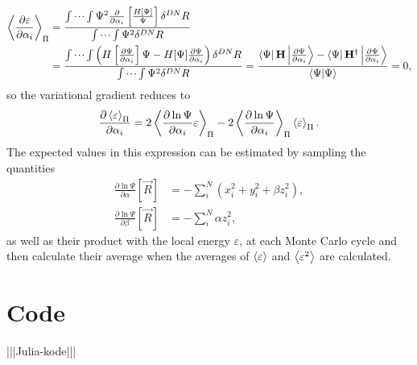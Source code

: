 \documentclass[a4paper,8pt]{article}
\begin{document}
\begin{align}
\ev{\frac{\partial\varepsilon}{\partial\alpha_i}}_\Pi &= \frac{\idotsint\Psi^2\frac{\partial}{\partial\alpha_i}\left[\frac{H[\Psi]}{\Psi}\right]\delta^{DN}R}{\idotsint \Psi^2 \delta^{DN}R} \nonumber\\
&= \frac{\idotsint\left(H\left[\frac{\partial\Psi}{\partial\alpha_i}\right]\Psi-H[\Psi]\frac{\partial\Psi}{\partial\alpha_i}\right)\delta^{DN}R}{\idotsint \Psi^2 \delta^{DN}R} = \frac{\bra{\Psi}\mathbf{H}\ket{\frac{\partial\Psi}{\partial\alpha_i}}-\bra{\Psi}\mathbf{H}^\dagger\ket{\frac{\partial\Psi}{\partial\alpha_i}}}{\braket{\Psi}{\Psi}} = 0,
\end{align}
so the variational gradient reduces to
\begin{equation}
\frac{\partial\ev{\varepsilon}_\Pi}{\partial\alpha_i} = 2\ev{\frac{\partial\ln\Psi}{\partial\alpha_i}\varepsilon}_\Pi-2\ev{\frac{\partial\ln\Psi}{\partial\alpha_i}}_\Pi\ev{\varepsilon}_\Pi.
\end{equation}
The expected values in this expression can be estimated by sampling the quantities
\begin{align}
\frac{\partial\ln\Psi}{\partial\alpha}[\vec{R}] &= -\sum\limits_i^N \left(x_i^2 + y_i^2 + \beta z_i^2\right), \\
\frac{\partial\ln\Psi}{\partial\beta}[\vec{R}] &= -\sum\limits_i^N \alpha z_i^2,
\end{align}
as well as their product with the local energy $\varepsilon$, at each Monte Carlo cycle and then calculate their average when the averages of $\ev{\varepsilon}$ and $\ev{\varepsilon^2}$ are calculated.


\newpage
\section{Code}

|||Julia-kode|||
\end{document}
